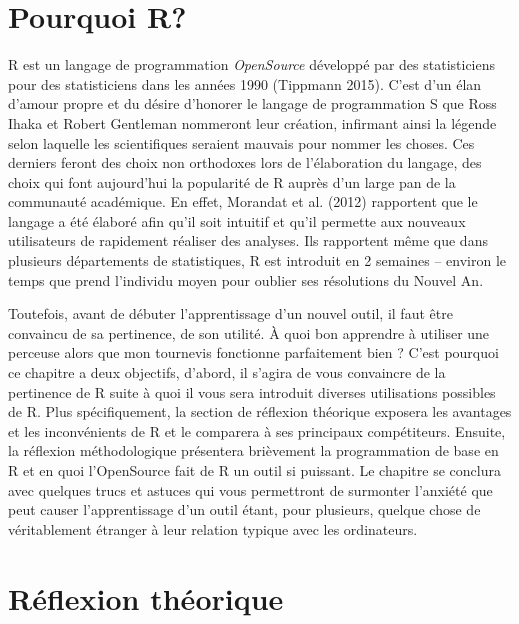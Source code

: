 \documentclass[
  letterpaper,
  DIV=11,
  numbers=noendperiod]{scrreprt}
\begin{document}
\hypertarget{pourquoi-r}{%
\section{Pourquoi R?}\label{pourquoi-r}}

R est un langage de programmation \emph{OpenSource} développé par des
statisticiens pour des statisticiens dans les années 1990 (Tippmann
2015). C'est d'un élan d'amour propre et du désire d'honorer le langage
de programmation S que Ross Ihaka et Robert Gentleman nommeront leur
création, infirmant ainsi la légende selon laquelle les scientifiques
seraient mauvais pour nommer les choses. Ces derniers feront des choix
non orthodoxes lors de l'élaboration du langage, des choix qui font
aujourd'hui la popularité de R auprès d'un large pan de la communauté
académique. En effet, Morandat et al. (2012) rapportent que le langage a
été élaboré afin qu'il soit intuitif et qu'il permette aux nouveaux
utilisateurs de rapidement réaliser des analyses. Ils rapportent même
que dans plusieurs départements de statistiques, R est introduit en 2
semaines -- environ le temps que prend l'individu moyen pour oublier ses
résolutions du Nouvel An.

Toutefois, avant de débuter l'apprentissage d'un nouvel outil, il faut
être convaincu de sa pertinence, de son utilité. À quoi bon apprendre à
utiliser une perceuse alors que mon tournevis fonctionne parfaitement
bien ? C'est pourquoi ce chapitre a deux objectifs, d'abord, il s'agira
de vous convaincre de la pertinence de R suite à quoi il vous sera
introduit diverses utilisations possibles de R. Plus spécifiquement, la
section de réflexion théorique exposera les avantages et les
inconvénients de R et le comparera à ses principaux compétiteurs.
Ensuite, la réflexion méthodologique présentera brièvement la
programmation de base en R et en quoi l'OpenSource fait de R un outil si
puissant. Le chapitre se conclura avec quelques trucs et astuces qui
vous permettront de surmonter l'anxiété que peut causer l'apprentissage
d'un outil étant, pour plusieurs, quelque chose de véritablement
étranger à leur relation typique avec les ordinateurs.

\hypertarget{ruxe9flexion-thuxe9orique}{%
\section{Réflexion théorique}\label{ruxe9flexion-thuxe9orique}}
\end{document}
